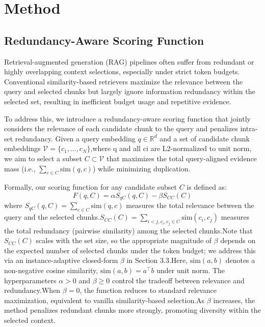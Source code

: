 \documentclass[11pt]{article}
\begin{document}
\section{Method}
\subsection{Redundancy-Aware Scoring Function}
Retrieval-augmented generation (RAG) pipelines often suffer from redundant or highly overlapping context selections, especially under strict token budgets. Conventional similarity-based retrievers maximize the relevance between the query and selected chunks but largely ignore information redundancy within the selected set, resulting in inefficient budget usage and repetitive evidence.

To address this, we introduce a redundancy-aware scoring function that jointly considers the relevance of each candidate chunk to the query and penalizes intra-set redundancy. Given a query embedding $q \in \mathbb{R}^d$ and a set of candidate chunk embeddings $\mathcal{V} = \{c_1, \ldots, c_N\}$,where q and all ci are L2-normalized to unit norm, we aim to select a subset $C \subset \mathcal{V}$ that maximizes the total query-aligned evidence mass (i.e., $\sum_{c \in C} \mathrm{sim}(q, c)$) while minimizing duplication.

Formally, our scoring function for any candidate subset $C$ is defined as:
\begin{equation}
  \label{eq:example}
  F(q, C) = \alpha S_{qC}(q, C) - \beta S_{CC}(C)
\end{equation}
where $S_{qC}(q, C) = \sum_{c \in C} \mathrm{sim}(q, c)$ measures the total relevance between the query and the selected chunks.$S_{CC}(C) = \sum_{i < j, c_i, c_j \in C} \mathrm{sim}(c_i, c_j)$ measures the total redundancy (pairwise similarity) among the selected chunks.Note that $S_{CC}(C)$ scales with the set size, so the appropriate magnitude of $\beta$ depends on the expected number of selected chunks under the token budget; we address this via an instance-adaptive closed-form $\beta$ in Section 3.3.Here, $\mathrm{sim}(a, b)$ denotes a non-negative cosine similarity, $\mathrm{sim}(a, b) = a^\top b$ under unit norm. The hyperparameters $\alpha > 0$ and $\beta \geq 0$ control the tradeoff between relevance and redundancy.When $\beta = 0$, the function reduces to standard relevance maximization, equivalent to vanilla similarity-based selection.As $\beta$ increases, the method penalizes redundant chunks more strongly, promoting diversity within the selected context.
\end{document}
